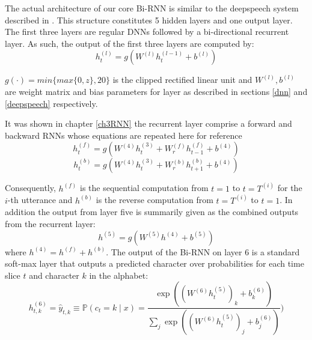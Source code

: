 The actual architecture of our core Bi-RNN is similar to the deepspeech system described in \cite{hannun2014deep}. This structure constitutes 5 hidden layers and one output layer.  The first three layers are regular DNNs followed by a bi-directional recurrent layer. As such, the output of the first three layers are computed by:
\begin{equation}
    h^{(l)}_t = g(W^{(l)} h^{(l−1)}_t + b^{(l)})\label{ch06_01_l1-3}
\end{equation}

$g(\cdot) = min\{max\{0,z\},20\}$  is the clipped rectified linear unit and $W^{(l)},b^{(l)}$ are weight matrix and bias parameters for layer  as described in sections \ref{dnn} and \ref{deepspeech} respectively.

It was shown in chapter \ref{ch3RNN} the recurrent layer comprise a forward and backward RNNs whose equations are repeated here for reference
\begin{equation}
    h^{(f)}_t = g(W^{(4)} h^{(3)}_t + W^{(f)}_r h^{(f)}_{t−1} + b^{(4)})
    \label{ch06_02_fwd}
\end{equation}
\begin{equation}
h^{(b)}_t = g(W^{(4)} h^{(3)}_t + W^{(b)}_r h^{(b)}_{t+1} + b^{(4)})    \label{ch06_03_bwd}
\end{equation}

Consequently, $h^{(f)}$ is the sequential computation from $t=1$ to $t=T^{(i)}$ for the $i$-th utterance and $h^{(b)}$ is the reverse computation from $t=T^{(i)}$ to $t=1$.  In addition the output from layer five is summarily given as the combined outputs from the recurrent layer:
\begin{equation}
h^{(5)} = g(W^{(5)} h^{(4)} + b^{(5)})    \label{ch06_04_l5}
\end{equation}
where $h^{(4)} = h^{(f)} + h^{(b)}$. The output of the Bi-RNN on layer 6 is a standard soft-max layer that outputs a predicted character over probabilities for each time slice $t$ and character $k$ in the alphabet:
\begin{equation}
h^{(6)}_{t,k} = \hat{y}_{t,k} \equiv \mathbb{P}(c_t = k \mid x) = \frac{\exp{ \left( (W^{(6)} h^{(5)}_t)_k + b^{(6)}_k \right)}}{\sum_j \exp{\left( (W^{(6)} h^{(5)}_t)_j + b^{(6)}_j \right)}})    \label{ch06_05_l6}
\end{equation}

